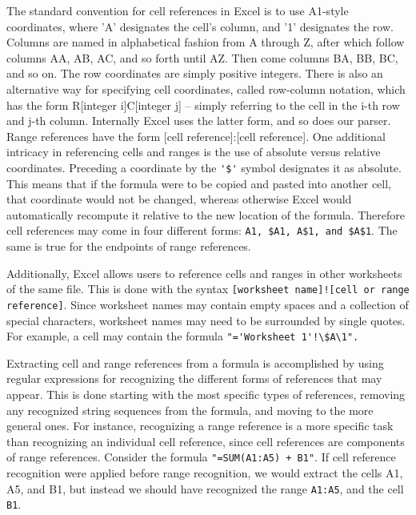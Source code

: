 The standard convention for cell references in Excel is to use A1-style
coordinates, where 'A' designates the cell's column, and '1' designates
the row.  Columns are named in alphabetical fashion from A through Z,
after which follow columns AA, AB, AC, and so forth until AZ. Then come
columns BA, BB, BC, and so on.  The row coordinates are simply positive
integers.  There is also an alternative way for specifying cell
coordinates, called row-column notation, which has the form
R[integer i]C[integer j] -- simply referring to the cell in the i-th row
and j-th column.  Internally Excel uses the latter form, and so does our
parser.  Range references have the form [cell reference]:[cell reference].
One additional intricacy in referencing cells and ranges is the use of
absolute versus relative coordinates.  Preceding a coordinate by the
\verb|'$'| symbol designates it as absolute.  This means that if the formula
were to be copied and pasted into another cell, that coordinate would not
be changed, whereas otherwise Excel would automatically recompute it
relative to the new location of the formula.  Therefore cell references
may come in four different forms: \verb|A1, $A1, A$1, and $A$1|.  The same is
true for the endpoints of range references.

Additionally, Excel allows users to reference cells and ranges in other
worksheets of the same file. This is done with the syntax
\verb|[worksheet name]![cell or range reference]|. Since worksheet names may contain
empty spaces and a collection of special characters, worksheet names may
need to be surrounded by single quotes.  For example, a cell may contain the
formula \verb|"='Worksheet 1'!\$A\1".|

Extracting cell and range references from a formula is accomplished by
using regular expressions for recognizing the different forms of references
that may appear.  This is done starting with the most specific types of
references, removing any recognized string sequences from the formula,
and moving to the more general ones.  For instance, recognizing a range
reference is a more specific task than recognizing an individual cell
reference, since cell references are components of range references.  Consider
the formula \verb|"=SUM(A1:A5) + B1"|. If cell reference recognition were applied
before range recognition, we would extract the cells A1, A5, and B1, but instead
we should have recognized the range \verb|A1:A5|, and the cell \verb|B1|.

